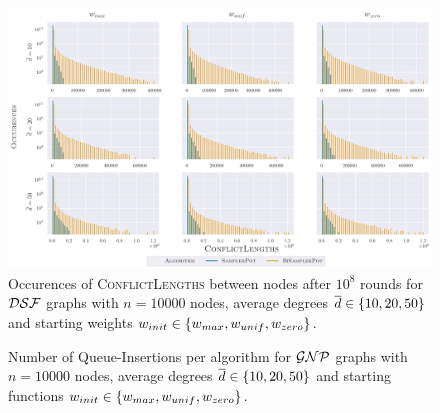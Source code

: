 \begin{figure}
  \centering
  \includegraphics[width=\textwidth]{Figures/experiments/NodeConflicts_Dsf.pdf}
  \caption{
    Occurences of \textsc{ConflictLengths} between nodes after $10^8$ rounds for $\mathcal{DSF}$ graphs with $n = 10000$ nodes, average degrees $\overline{d} \in \left\{10, 20, 50\right\}$ and starting weights $w_{init} \in \left\{w_{max}, w_{unif}, w_{zero}\right\}$.
  }
  \label{fig:app_node_conflicts_dsf}
\end{figure}

\begin{figure}[!htb]
  \centering
  \caption{
      Number of Queue-Insertions per algorithm for $\mathcal{GNP}$ graphs with $n = 10000$ nodes, average degrees $\overline{d} \in \left\{10, 20, 50\right\}$ and starting functions $w_{init} \in \left\{w_{max}, w_{unif}, w_{zero}\right\}$.
  }
  \label{fig:app_ins_gnp}
\end{figure}

